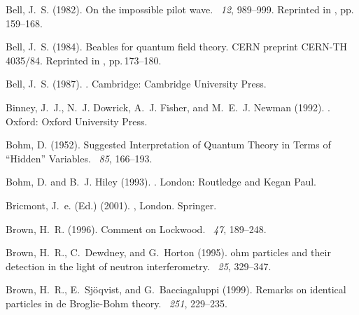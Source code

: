 \documentclass[12pt]{article}
\begin{document}
\begin{thebibliography}{}
Bell, J.~S. (1982).
\newblock On the impossible pilot wave.
~{\em 12}, 989--999.
\newblock Reprinted in , pp.\,159--168.

Bell, J.~S. (1984).
\newblock Beables for quantum field theory.
\newblock CERN preprint CERN-TH 4035/84. Reprinted in ,
  pp.\,173--180.

Bell, J.~S. (1987).
.
\newblock Cambridge: Cambridge University Press.

Binney, J.~J., N.~J. Dowrick, A.~J. Fisher, and M.~E.~J. Newman (1992).
.
\newblock Oxford: Oxford University Press.

Bohm, D. (1952).
 {S}uggested {I}nterpretation of {Q}uantum {T}heory in {T}erms of
  ``{H}idden'' {V}ariables.
~{\em 85}, 166--193.

Bohm, D. and B.~J. Hiley (1993).
.
\newblock London: Routledge and Kegan Paul.

Bricmont, J.~e. (Ed.) (2001).
, London.
  Springer.

Brown, H.~R. (1996).
\newblock Comment on {L}ockwood.
~{\em 47},
  189--248.

Brown, H.~R., C.~Dewdney, and G.~Horton (1995).
ohm particles and their detection in the light of neutron
  interferometry.
~{\em 25}, 329--347.

Brown, H.~R., E.~Sj{\"o}qvist, and G.~Bacciagaluppi (1999).
\newblock Remarks on identical particles in de {B}roglie-{B}ohm theory.
~{\em 251}, 229--235.


\end{thebibliography}
\end{document}
